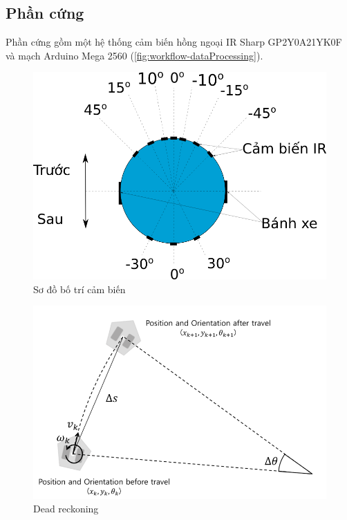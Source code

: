 
\subsection{Phần cứng}


Phần cứng gồm một hệ thống cảm biến hồng ngoại IR Sharp GP2Y0A21YK0F và mạch Arduino Mega 2560 (\figurename{\ref{fig:workflow-dataProcessing}}).

\begin{figure}[htbp]
	\centering
	\includegraphics[width=0.7\linewidth]{figures/IR_layout.png}
	\caption{Sơ đồ bố trí cảm biến}
	\label{fig:IR_layout.png}
\end{figure}

\begin{figure}[htbp]
    \centering
    \includegraphics[width=0.7\linewidth]{figures/dead-reckoning.png}
    \caption{Dead reckoning \cite{pyo2017ros}}
    \label{fig:dead-reckoning}
\end{figure}

